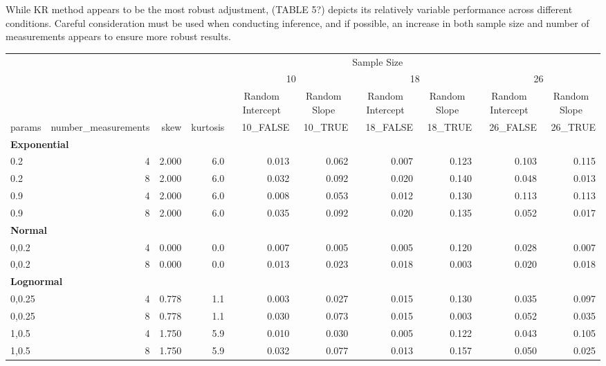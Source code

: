 \documentclass[12pt, twoside]{amherstthesis}
\begin{document}
While KR method appears to be the most robust adjustment, (TABLE 5?) depicts its relatively variable performance across different conditions. Careful consideration must be used when conducting inference, and if possible, an increase in both sample size and number of measurements appears to ensure more robust results.
\begin{landscape}
\begin{tabular}[t]{l|r|r|r|r|r|r|r|r|r}
\hline
\multicolumn{2}{c|}{ } & \multicolumn{8}{c}{Sample Size} \\
\cline{3-10}
\multicolumn{4}{c|}{ } & \multicolumn{2}{c|}{10} & \multicolumn{2}{c|}{18} & \multicolumn{2}{c}{26} \\
\cline{5-6} \cline{7-8} \cline{9-10}
\multicolumn{4}{c|}{ } & \multicolumn{1}{c|}{Random Intercept} & \multicolumn{1}{c|}{Random Slope} & \multicolumn{1}{c|}{Random Intercept} & \multicolumn{1}{c|}{Random Slope} & \multicolumn{1}{c|}{Random Intercept} & \multicolumn{1}{c}{Random Slope} \\
\cline{5-5} \cline{6-6} \cline{7-7} \cline{8-8} \cline{9-9} \cline{10-10}
params & number\_measurements & skew & kurtosis & 10\_FALSE & 10\_TRUE & 18\_FALSE & 18\_TRUE & 26\_FALSE & 26\_TRUE\\
\hline
\multicolumn{10}{l}{\textbf{Exponential}}\\
\hline
\hspace{1em}0.2 & 4 & 2.000 & 6.0 & 0.013 & 0.062 & 0.007 & 0.123 & 0.103 & 0.115\\
\hline
\hspace{1em}0.2 & 8 & 2.000 & 6.0 & 0.032 & 0.092 & 0.020 & 0.140 & 0.048 & 0.013\\
\hline
\hspace{1em}0.9 & 4 & 2.000 & 6.0 & 0.008 & 0.053 & 0.012 & 0.130 & 0.113 & 0.113\\
\hline
\hspace{1em}0.9 & 8 & 2.000 & 6.0 & 0.035 & 0.092 & 0.020 & 0.135 & 0.052 & 0.017\\
\hline
\multicolumn{10}{l}{\textbf{Normal}}\\
\hline
\hspace{1em}0,0.2 & 4 & 0.000 & 0.0 & 0.007 & 0.005 & 0.005 & 0.120 & 0.028 & 0.007\\
\hline
\hspace{1em}0,0.2 & 8 & 0.000 & 0.0 & 0.013 & 0.023 & 0.018 & 0.003 & 0.020 & 0.018\\
\hline
\multicolumn{10}{l}{\textbf{Lognormal}}\\
\hline
\hspace{1em}0,0.25 & 4 & 0.778 & 1.1 & 0.003 & 0.027 & 0.015 & 0.130 & 0.035 & 0.097\\
\hline
\hspace{1em}0,0.25 & 8 & 0.778 & 1.1 & 0.030 & 0.073 & 0.015 & 0.003 & 0.052 & 0.035\\
\hline
\hspace{1em}1,0.5 & 4 & 1.750 & 5.9 & 0.010 & 0.030 & 0.005 & 0.122 & 0.043 & 0.105\\
\hline
\hspace{1em}1,0.5 & 8 & 1.750 & 5.9 & 0.032 & 0.077 & 0.013 & 0.157 & 0.050 & 0.025\\
\hline
\end{tabular}
\end{landscape}
\end{document}
